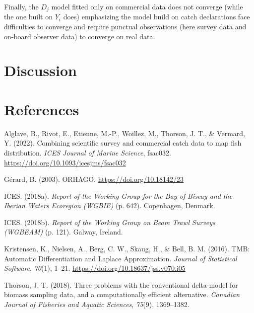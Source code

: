 \documentclass[
  english,
  man]{apa6}
\begin{document}
Finally, the \(D_j\) model fitted only on commercial data does not converge (while the one built on \(Y_i\) does) emphasizing the model build on catch declarations face difficulties to converge and require punctual observations (here survey data and on-board observer data) to converge on real data.

\hypertarget{discussion}{%
\section{Discussion}\label{discussion}}

\newpage

\hypertarget{references}{%
\section{References}\label{references}}

\begingroup
\setlength{\parindent}{-0.5in}
\setlength{\leftskip}{0.5in}

\hypertarget{refs}{}
\leavevmode\hypertarget{ref-alglave_combining_2022}{}%
Alglave, B., Rivot, E., Etienne, M.-P., Woillez, M., Thorson, J. T., \& Vermard, Y. (2022). Combining scientific survey and commercial catch data to map fish distribution. \emph{ICES Journal of Marine Science}, fsac032. \url{https://doi.org/10.1093/icesjms/fsac032}

\leavevmode\hypertarget{ref-biais_gerard_orhago_2003}{}%
Gérard, B. (2003). ORHAGO. \url{https://doi.org/10.18142/23}

\leavevmode\hypertarget{ref-ices_report_2018-1}{}%
ICES. (2018a). \emph{Report of the Working Group for the Bay of Biscay and the Iberian Waters Ecoregion (WGBIE)} (p. 642). Copenhagen, Denmark.

\leavevmode\hypertarget{ref-ices_report_2018}{}%
ICES. (2018b). \emph{Report of the Working Group on Beam Trawl Surveys (WGBEAM)} (p. 121). Galway, Ireland.

\leavevmode\hypertarget{ref-kristensen_tmb_2016}{}%
Kristensen, K., Nielsen, A., Berg, C. W., Skaug, H., \& Bell, B. M. (2016). TMB: Automatic Differentiation and Laplace Approximation. \emph{Journal of Statistical Software}, \emph{70}(1), 1--21. \url{https://doi.org/10.18637/jss.v070.i05}

\leavevmode\hypertarget{ref-thorson_three_2018}{}%
Thorson, J. T. (2018). Three problems with the conventional delta-model for biomass sampling data, and a computationally efficient alternative. \emph{Canadian Journal of Fisheries and Aquatic Sciences}, \emph{75}(9), 1369--1382.

\endgroup
\end{document}
